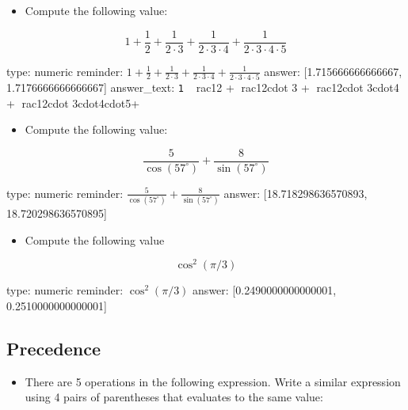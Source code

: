 \documentclass[12pt]{article}
\begin{document}
\begin{itemize}
\itemsep1pt\parskip0pt
\item
  Compute the following value:
\end{itemize}

\[
1 + \frac{1}{2} + \frac{1}{2\cdot 3} + \frac{1}{2\cdot 3\cdot4} + \frac{1}{2\cdot 3\cdot4\cdot5}
\]

\begin{answer}
    type: numeric
    reminder: \(1 + \frac{1}{2} + \frac{1}{2\cdot 3} + \frac{1}{2\cdot 3\cdot4} + \frac{1}{2\cdot 3\cdot4\cdot5}\)
    answer: [1.715666666666667, 1.7176666666666667]
answer_text: \verb+1 + rac{1}{2} + rac{1}{2cdot 3} + rac{1}{2cdot 3cdot4} + rac{1}{2cdot 3cdot4cdot5}+ 
\end{answer}

\begin{itemize}
\itemsep1pt\parskip0pt
\item
  Compute the following value:
\end{itemize}

\[
\frac{5}{\cos(57^\circ)}  + \frac{8}{\sin(57^\circ)}
\]

\begin{answer}
    type: numeric
    reminder: \( \frac{5}{\cos(57^\circ)}  + \frac{8}{\sin(57^\circ)} \)
    answer: [18.718298636570893, 18.720298636570895]

\end{answer}

\begin{itemize}
\itemsep1pt\parskip0pt
\item
  Compute the following value
\end{itemize}

\[
\cos^2(\pi/3)
\]

\begin{answer}
    type: numeric
    reminder: \( \cos^2(\pi/3) \)
    answer: [0.2490000000000001, 0.2510000000000001]

\end{answer}

\subsection{Precedence}

\begin{itemize}
\itemsep1pt\parskip0pt
\item
  There are 5 operations in the following expression. Write a similar
  expression using 4 pairs of parentheses that evaluates to the same
  value:
\end{itemize}
\end{document}
